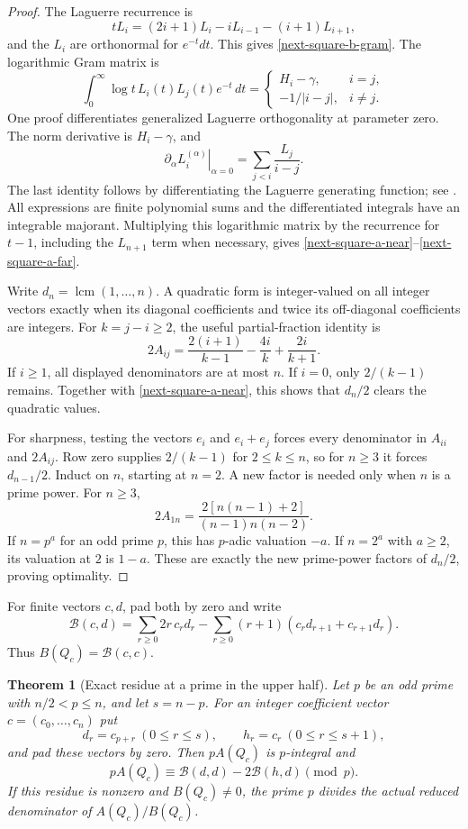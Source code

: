 \documentclass[11pt,a4paper]{article}
\newtheorem{theorem}{Theorem}[section]
\theoremstyle{definition}
\theoremstyle{remark}
\begin{document}
\begin{proof}
The Laguerre recurrence is
\[
 tL_i=(2i+1)L_i-iL_{i-1}-(i+1)L_{i+1},
\]
and the $L_i$ are orthonormal for $e^{-t}dt$. This gives
\eqref{next-square-b-gram}. The logarithmic Gram matrix is
\[
 \int_0^\infty \log t\,L_i(t)L_j(t)e^{-t}\,dt
 =
 \begin{cases}
 H_i-\gamma,&i=j,\\
 -1/|i-j|,&i\ne j.
 \end{cases}
\]
One proof differentiates generalized Laguerre orthogonality at parameter
zero. The norm derivative is $H_i-\gamma$, and
\[
 \left.\partial_\alpha L_i^{(\alpha)}\right|_{\alpha=0}
 =\sum_{j<i}\frac{L_j}{i-j}.
\]
The last identity follows by differentiating the Laguerre generating
function; see \cite{dlmf-laguerre}. All expressions are finite polynomial
sums and the differentiated integrals have an integrable majorant.
Multiplying this logarithmic matrix by the recurrence for $t-1$, including
the $L_{n+1}$ term when necessary, gives
\eqref{next-square-a-near}--\eqref{next-square-a-far}.

Write $d_n=\operatorname{lcm}(1,\ldots,n)$. A quadratic form is
integer-valued on all integer vectors exactly when its diagonal
coefficients and twice its off-diagonal coefficients are integers.
For $k=j-i\ge2$, the useful partial-fraction identity is
\[
 2A_{ij}=\frac{2(i+1)}{k-1}-\frac{4i}{k}+\frac{2i}{k+1}.
\]
If $i\ge1$, all displayed denominators are at most $n$. If $i=0$, only
$2/(k-1)$ remains. Together with \eqref{next-square-a-near}, this shows
that $d_n/2$ clears the quadratic values.

For sharpness, testing the vectors $e_i$ and $e_i+e_j$ forces every
denominator in $A_{ii}$ and $2A_{ij}$. Row zero supplies
$2/(k-1)$ for $2\le k\le n$, so for $n\ge3$ it forces
$d_{n-1}/2$. Induct on $n$, starting at $n=2$. A new factor is needed
only when $n$ is a prime power. For $n\ge3$,
\[
 2A_{1n}=\frac{2[n(n-1)+2]}{(n-1)n(n-2)}.
\]
If $n=p^a$ for an odd prime $p$, this has $p$-adic valuation $-a$.
If $n=2^a$ with $a\ge2$, its valuation at $2$ is $1-a$. These are
exactly the new prime-power factors of $d_n/2$, proving optimality.
\end{proof}

For finite vectors $c,d$, pad both by zero and write
\[
 \mathcal B(c,d)=
 \sum_{r\ge0}2r\,c_rd_r
 -\sum_{r\ge0}(r+1)(c_rd_{r+1}+c_{r+1}d_r).
\]
Thus $B(Q_c)=\mathcal B(c,c)$.

\begin{theorem}[Exact residue at a prime in the upper half]
\label{next-square-prime-block}
Let $p$ be an odd prime with $n/2<p\le n$, and let $s=n-p$. For an integer
coefficient vector $c=(c_0,\ldots,c_n)$ put
\[
 d_r=c_{p+r}\ (0\le r\le s),\qquad
 h_r=c_r\ (0\le r\le s+1),
\]
and pad these vectors by zero. Then $pA(Q_c)$ is $p$-integral and
\begin{equation}
 pA(Q_c)\equiv
 \mathcal B(d,d)-2\mathcal B(h,d)\pmod p.
 \label{next-square-prime-residue}
\end{equation}
If this residue is nonzero and $B(Q_c)\ne0$, the prime $p$ divides the
actual reduced denominator of $A(Q_c)/B(Q_c)$.
\end{theorem}
\end{document}
